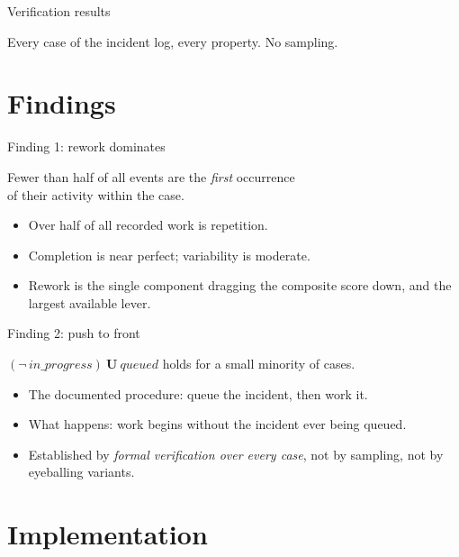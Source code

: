 \documentclass[aspectratio=169]{beamer}
\begin{document}
\begin{frame}{Verification results}
\begin{center}\small\end{center}
\vspace{-0.3em}
\begin{center}
\small Every case of the incident log, every property. No sampling.
\end{center}
\end{frame}


\section{Findings}

\begin{frame}{Finding 1: rework dominates}
\begin{center}
\Large
Fewer than half of all events are the \emph{first} occurrence\\
of their activity within the case.
\end{center}
\bigskip
\begin{itemize}
  \item Over half of all recorded work is repetition.
  \item Completion is near perfect; variability is moderate.
  \item Rework is the single component dragging the composite score down,
        and the largest available lever.
\end{itemize}
\end{frame}


\begin{frame}{Finding 2: push to front}
\begin{center}
\Large
$(\neg\,\textit{in\_progress}) \ \mathbf{U}\ \textit{queued}$ \quad holds for a
small minority of cases.
\end{center}
\bigskip
\begin{itemize}
  \item The documented procedure: queue the incident, then work it.
  \item What happens: work begins without the incident ever being queued.
  \item Established by \emph{formal verification over every case}, not by
        sampling, not by eyeballing variants.
\end{itemize}
\end{frame}




\section{Implementation}
\end{document}
